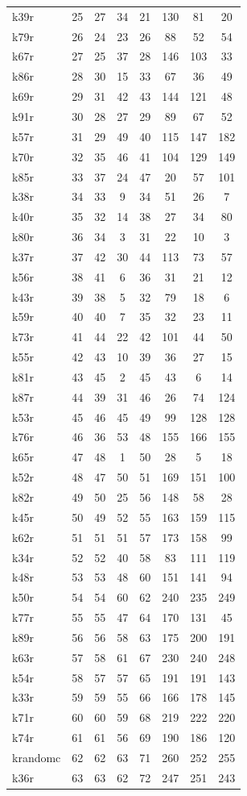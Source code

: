 \begin{tabular}{lccccccc}
k39r & 25 & 27 & 34 & 21 & 130 & 81 & 20 \\
k79r & 26 & 24 & 23 & 26 & 88 & 52 & 54 \\
k67r & 27 & 25 & 37 & 28 & 146 & 103 & 33 \\
k86r & 28 & 30 & 15 & 33 & 67 & 36 & 49 \\
k69r & 29 & 31 & 42 & 43 & 144 & 121 & 48 \\
k91r & 30 & 28 & 27 & 29 & 89 & 67 & 52 \\
k57r & 31 & 29 & 49 & 40 & 115 & 147 & 182 \\
k70r & 32 & 35 & 46 & 41 & 104 & 129 & 149 \\
k85r & 33 & 37 & 24 & 47 & 20 & 57 & 101 \\
k38r & 34 & 33 & 9 & 34 & 51 & 26 & 7 \\
k40r & 35 & 32 & 14 & 38 & 27 & 34 & 80 \\
k80r & 36 & 34 & 3 & 31 & 22 & 10 & 3 \\
k37r & 37 & 42 & 30 & 44 & 113 & 73 & 57 \\
k56r & 38 & 41 & 6 & 36 & 31 & 21 & 12 \\
k43r & 39 & 38 & 5 & 32 & 79 & 18 & 6 \\
k59r & 40 & 40 & 7 & 35 & 32 & 23 & 11 \\
k73r & 41 & 44 & 22 & 42 & 101 & 44 & 50 \\
k55r & 42 & 43 & 10 & 39 & 36 & 27 & 15 \\
k81r & 43 & 45 & 2 & 45 & 43 & 6 & 14 \\
k87r & 44 & 39 & 31 & 46 & 26 & 74 & 124 \\
k53r & 45 & 46 & 45 & 49 & 99 & 128 & 128 \\
k76r & 46 & 36 & 53 & 48 & 155 & 166 & 155 \\
k65r & 47 & 48 & 1 & 50 & 28 & 5 & 18 \\
k52r & 48 & 47 & 50 & 51 & 169 & 151 & 100 \\
k82r & 49 & 50 & 25 & 56 & 148 & 58 & 28 \\
k45r & 50 & 49 & 52 & 55 & 163 & 159 & 115 \\
k62r & 51 & 51 & 51 & 57 & 173 & 158 & 99 \\
k34r & 52 & 52 & 40 & 58 & 83 & 111 & 119 \\
k48r & 53 & 53 & 48 & 60 & 151 & 141 & 94 \\
k50r & 54 & 54 & 60 & 62 & 240 & 235 & 249 \\
k77r & 55 & 55 & 47 & 64 & 170 & 131 & 45 \\
k89r & 56 & 56 & 58 & 63 & 175 & 200 & 191 \\
k63r & 57 & 58 & 61 & 67 & 230 & 240 & 248 \\
k54r & 58 & 57 & 57 & 65 & 191 & 191 & 143 \\
k33r & 59 & 59 & 55 & 66 & 166 & 178 & 145 \\
k71r & 60 & 60 & 59 & 68 & 219 & 222 & 220 \\
k74r & 61 & 61 & 56 & 69 & 190 & 186 & 120 \\
krandomc & 62 & 62 & 63 & 71 & 260 & 252 & 255 \\
k36r & 63 & 63 & 62 & 72 & 247 & 251 & 243 \\
\bottomrule
\end{tabular}
